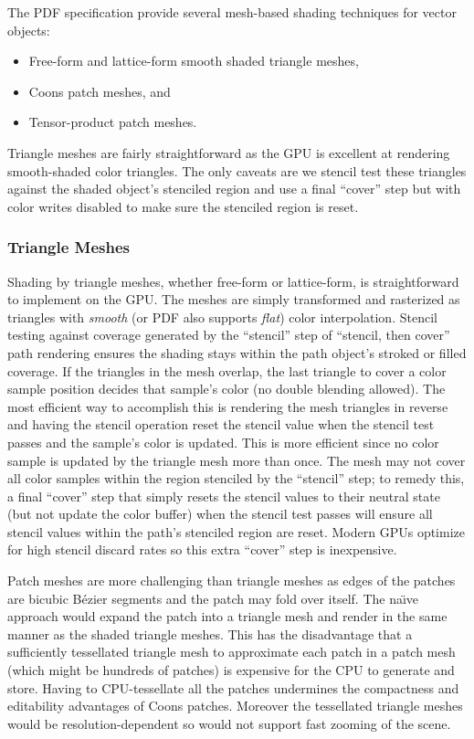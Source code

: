 The PDF specification provide several mesh-based shading techniques for vector objects:
\begin{itemize}
\item Free-form and lattice-form smooth shaded triangle meshes,
\item Coons patch \cite{CoonsPaper} meshes, and
\item Tensor-product patch meshes.
\end{itemize}

Triangle meshes are fairly straightforward as the GPU is excellent at rendering smooth-shaded color triangles.
The only caveats are we stencil test these triangles against the shaded object's stenciled region and use
a final ``cover'' step but with color writes disabled to make sure the stenciled region is reset.

\ifdefined\NOSHOW
\subsubsection{Triangle Meshes}

Shading by triangle meshes, whether free-form or lattice-form,
is straightforward to implement on the GPU.  The meshes are simply transformed and rasterized
as triangles with {\em smooth} (or PDF also supports {\em flat}) color interpolation.  Stencil testing against coverage generated by the ``stencil'' step
of ``stencil, then cover'' path rendering ensures the shading stays within the path object's stroked or filled coverage.
If the triangles in the mesh overlap, the last triangle to cover a color sample position decides that sample's color (no double blending allowed).  The most efficient way to accomplish this is rendering the mesh triangles in reverse and having
the stencil operation reset the stencil value when the stencil test passes and the sample's color is updated.  This
is more efficient since no color sample is updated by the triangle mesh more than once.  The mesh may not
cover all color samples within the region stenciled by the ``stencil'' step; to remedy this, a final ``cover'' step that simply resets
the stencil values to their neutral state (but not update the color buffer) when the stencil test passes
will ensure all 
stencil values within the path's stenciled region are reset.  Modern GPUs optimize for high stencil discard rates
so this extra ``cover'' step is inexpensive.
\fi

Patch meshes are more challenging than triangle meshes as edges of the patches are bicubic B\'{e}zier segments and the patch may fold over itself.  The na\"{\i}ve approach would expand the patch into a triangle mesh and render in the same manner as the shaded triangle meshes.  This has the disadvantage that a sufficiently tessellated triangle mesh to approximate each patch in a patch mesh (which might be hundreds of patches) is expensive for the CPU to generate and store.  Having to CPU-tessellate all the patches undermines the compactness and editability advantages of Coons patches.  Moreover the tessellated triangle meshes would be resolution-dependent so would not support fast zooming of the scene.


